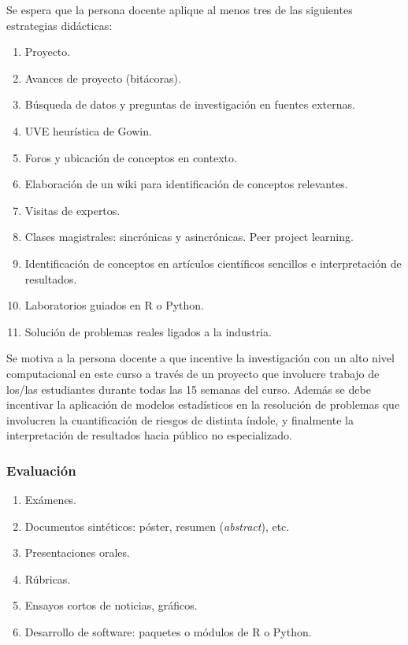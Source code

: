 \begin{refsection}
Se espera que la persona docente aplique al menos tres de las siguientes estrategias didácticas:

\begin{enumerate}
\item Proyecto.
\item Avances de proyecto (bitácoras).
\item Búsqueda de datos y preguntas de investigación en fuentes externas.
\item UVE heurística de Gowin.
\item Foros y ubicación de conceptos en contexto.
\item Elaboración de un wiki para identificación de conceptos relevantes.
\item Visitas de expertos.
\item Clases magistrales: sincrónicas y asincrónicas. Peer project learning.
\item Identificación de conceptos en artículos científicos sencillos e interpretación de resultados.
\item Laboratorios guiados en R o Python.
\item Solución de problemas reales ligados a la industria.
\end{enumerate}

Se motiva a la persona docente a que incentive la investigación con un alto nivel computacional en este curso a través de un proyecto que involucre trabajo de los/las estudiantes durante todas las 15 semanas del curso. Además se debe incentivar la aplicación de modelos estadísticos en la resolución de problemas que involucren la cuantificación de riesgos de distinta índole, y finalmente la interpretación de resultados hacia público no especializado.

\subsubsection*{Evaluación}

\begin{enumerate}
\item Exámenes.
\item Documentos sintéticos: póster, resumen (\emph{abstract}), etc.
\item Presentaciones orales.
\item Rúbricas.
\item Ensayos cortos de noticias, gráficos.
\item Desarrollo de software: paquetes o módulos de R o Python.
\end{enumerate}

\nocite{JWHT13}
\nocite{TCG14}
\nocite{HTF09}
\nocite{HBBB19}
\nocite{LMP95}
\nocite{EP98}
\nocite{Pag15}
\nocite{CC80}

\printcursosbibliography

\end{refsection}
